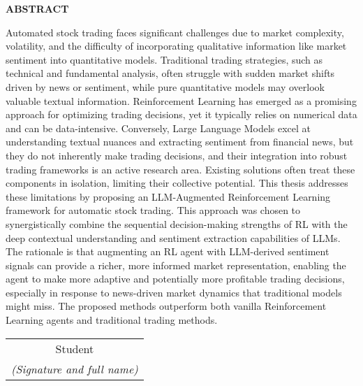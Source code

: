\begin{center}
    \Large{\textbf{ABSTRACT}}\\
\end{center}
\vspace{1cm}
Automated stock trading faces significant challenges due to market complexity, volatility, and the difficulty of incorporating qualitative information like market sentiment into quantitative models. Traditional trading strategies, such as technical and fundamental analysis, often struggle with sudden market shifts driven by news or sentiment, while pure quantitative models may overlook valuable textual information. Reinforcement Learning has emerged as a promising approach for optimizing trading decisions, yet it typically relies on numerical data and can be data-intensive. Conversely, Large Language Models excel at understanding textual nuances and extracting sentiment from financial news, but they do not inherently make trading decisions, and their integration into robust trading frameworks is an active research area. Existing solutions often treat these components in isolation, limiting their collective potential. This thesis addresses these limitations by proposing an LLM-Augmented Reinforcement Learning framework for automatic stock trading. This approach was chosen to synergistically combine the sequential decision-making strengths of RL with the deep contextual understanding and sentiment extraction capabilities of LLMs. The rationale is that augmenting an RL agent with LLM-derived sentiment signals can provide a richer, more informed market representation, enabling the agent to make more adaptive and potentially more profitable trading decisions, especially in response to news-driven market dynamics that traditional models might miss. The proposed methods outperform both vanilla Reinforcement Learning agents and traditional trading methods.
\begin{flushright}
\begin{tabular}{@{}c@{}}
Student\\
\textit{(Signature and full name)}
\end{tabular}
\end{flushright}
